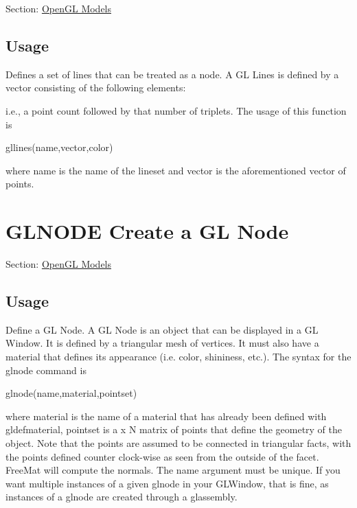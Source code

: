 Section\-: \hyperlink{sec_glwin}{Open\-G\-L Models} \hypertarget{vtkwidgets_vtkxyplotwidget_Usage}{}\subsection{Usage}\label{vtkwidgets_vtkxyplotwidget_Usage}
Defines a set of lines that can be treated as a node. A G\-L Lines is defined by a vector consisting of the following elements\-: \begin{DoxyVerb}   [m1 x1 y1 z1 ... xn yn zn m2 x1 y1 z1 .... ]
\end{DoxyVerb}
 i.\-e., a point count followed by that number of triplets. The usage of this function is \begin{DoxyVerb}  gllines(name,vector,color)
\end{DoxyVerb}
 where {\ttfamily name} is the name of the lineset and {\ttfamily vector} is the aforementioned vector of points. \hypertarget{glwin_glnode}{}\section{G\-L\-N\-O\-D\-E Create a G\-L Node}\label{glwin_glnode}
Section\-: \hyperlink{sec_glwin}{Open\-G\-L Models} \hypertarget{vtkwidgets_vtkxyplotwidget_Usage}{}\subsection{Usage}\label{vtkwidgets_vtkxyplotwidget_Usage}
Define a G\-L Node. A G\-L Node is an object that can be displayed in a G\-L Window. It is defined by a triangular mesh of vertices. It must also have a material that defines its appearance (i.\-e. color, shininess, etc.). The syntax for the {\ttfamily glnode} command is \begin{DoxyVerb}  glnode(name,material,pointset)  
\end{DoxyVerb}
 where {\ttfamily material} is the name of a material that has already been defined with {\ttfamily gldefmaterial}, {\ttfamily pointset} is a { x N} matrix of points that define the geometry of the object. Note that the points are assumed to be connected in triangular facts, with the points defined counter clock-\/wise as seen from the outside of the facet. {\ttfamily Free\-Mat} will compute the normals. The {\ttfamily name} argument must be unique. If you want multiple instances of a given {\ttfamily glnode} in your G\-L\-Window, that is fine, as instances of a {\ttfamily glnode} are created through a {\ttfamily glassembly}. 